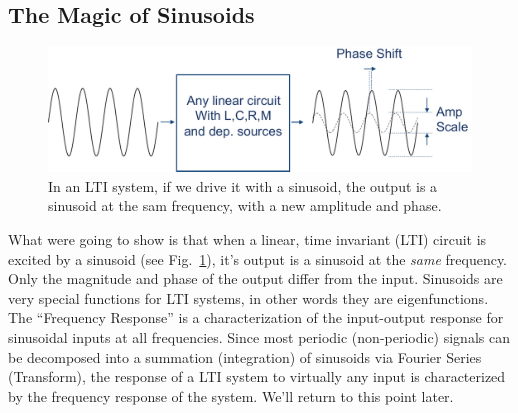 \subsection{The Magic of Sinusoids}
\begin{figure}[tb]
\centering
\includegraphics[width=.75\columnwidth]{lti_sine}
\caption{In an LTI system, if we drive it with a sinusoid, the output is a sinusoid at the sam frequency, with a new amplitude and phase. }
\label{fig:lti_sine}
\end{figure}
What were going to show is that when a linear, time invariant (LTI) circuit is excited by a sinusoid (see Fig.~\ref{fig:lti_sine}), it's output is a sinusoid at the \emph{same} frequency.  Only the magnitude and phase of the output differ from the input.  Sinusoids are very special functions for LTI systems, in other words they are eigenfunctions.  The ``Frequency Response'' is a characterization of the input-output response for sinusoidal inputs at all frequencies.
Since most periodic (non-periodic) signals can be decomposed into a summation (integration) of sinusoids via Fourier Series (Transform), the response of a LTI system to virtually any input is characterized by the frequency response of the system.  We'll return to this point later.

